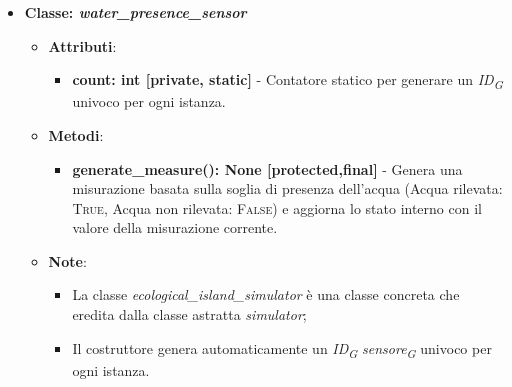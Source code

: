 \begin{itemize}
    \item{\textbf{Classe: \textit{water\_presence\_sensor}}}
    \begin{itemize}
        \item \textbf{Attributi}: 
        \begin{itemize}
            \item \textbf{count: int [private, static]} - Contatore statico per generare un \textit{ID}\textsubscript{\textit{G}} univoco per ogni istanza.
        \end{itemize}
        \item \textbf{Metodi}: 
        \begin{itemize}
            \item \textbf{generate\_measure(): None [protected,final]} - Genera una misurazione basata sulla soglia di presenza dell'acqua (Acqua rilevata: \textsc{True}, Acqua non rilevata: \textsc{False}) e aggiorna lo stato interno con il valore della misurazione corrente.
        \end{itemize}
        \item \textbf{Note}:
        \begin{itemize}
            \item La classe \textit{ecological\_island\_simulator} è una classe concreta che eredita dalla classe astratta \textit{simulator};
            \item Il costruttore genera automaticamente un \textit{ID}\textsubscript{\textit{G}} \textit{sensore}\textsubscript{\textit{G}} univoco per ogni istanza.
        \end{itemize}
    \end{itemize}


\end{itemize}
